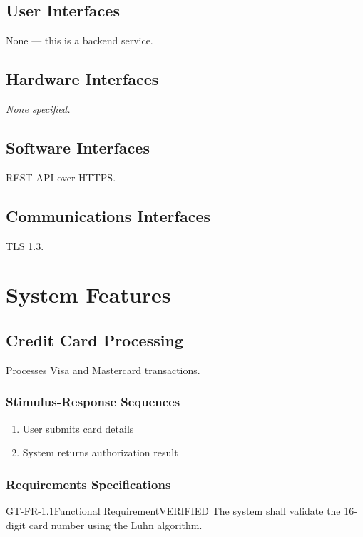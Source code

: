 \documentclass[11pt,a4paper]{article}
\begin{document}
\subsection{User Interfaces}
None — this is a backend service.

\subsection{Hardware Interfaces}
\textit{None specified.}\par\vspace{6pt}

\subsection{Software Interfaces}
REST API over HTTPS.

\subsection{Communications Interfaces}
TLS 1.3.

\section{System Features}
\subsection{Credit Card Processing}
Processes Visa and Mastercard transactions.

\subsubsection*{Stimulus-Response Sequences}
\begin{enumerate}[leftmargin=*]
    \item User submits card details
    \item System returns authorization result
\end{enumerate}

\subsubsection*{Requirements Specifications}
\begin{requirementbox}{GT-FR-1.1}{Functional Requirement}{VERIFIED}
The system shall validate the 16-digit card number using the Luhn algorithm.
\end{requirementbox}
\end{document}
